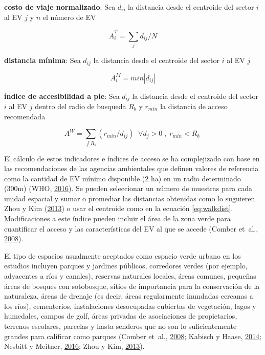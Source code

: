 \documentclass[12pt,a4paper,openany]{book}
\theoremstyle{definition}
\theoremstyle{definition}
\theoremstyle{definition}
\theoremstyle{remark}
\begin{document}
\textbf{costo de viaje normalizado}: Sea \(d_{ij}\) la distancia desde
el centroide del sector \(i\) al EV \(j\) y \(n\) el número de EV

\begin{equation}
\bar{A}^{T}_i =\sum_j{d_{ij}/N}
\label{eq:ncosto}
\end{equation}

\textbf{distancia mínima}: Sea \(d_{ij}\) la distancia desde el
centroide del sector \(i\) al EV \(j\)

\begin{equation}
A^{M}_i=min\left | d_{ij} \right | 
\label{eq:mindist}
\end{equation}

\textbf{índice de accesibilidad a pie}: Sea \(d_{ij}\) la distancia
desde el centroide del sector \(i\) al EV \(j\) dentro del radio de
busqueda \(R_b\) y \(r_{min}\) la distancia de acceso recomendada

\begin{equation}
A^{W}= \sum_{\int R_b }{(r_{min}/d_{ij})}  \;  \; \forall  d_j>0 \; , \; r_{min}<R_b  \;
\label{eq:walkdist}
\end{equation}

El cálculo de estos indicadores e índices de acceso se ha complejizado
con base en las recomendaciones de las agencias ambientales que definen
valores de referencia como la cantidad de EV mínimo disponible (2 ha) en
un radio determinado (300m) (WHO,
\protect\hyperlink{ref-who2016urban}{2016}). Se pueden seleccionar un
número de muestras para cada unidad espacial y sumar o promediar las
distancias obtenidas como lo suguieren Zhou y Kim
(\protect\hyperlink{ref-zhou_social_2013}{2013}) o usar el centroide
como en la ecuación \eqref{eq:walkdist}. Modificaciones a este índice
pueden incluir el área de la zona verde para cuantificar el acceso y las
características del EV al que se accede (Comber et~al.,
\protect\hyperlink{ref-comber_using_2008}{2008}).

El tipo de espacios usualmente aceptados como espacio verde urbano en
los estudios incluyen parques y jardines públicos, corredores verdes
(por ejemplo, adyacentes a ríos y canales), reservas naturales locales,
áreas comunes, pequeñas áreas de bosques con sotobosque, sitios de
importancia para la conservación de la naturaleza, áreas de drenaje (es
decir, áreas regularmente inundadas cercanas a los ríos), cementerios,
instalaciones desocupadas cubiertas de vegetación, lagos y humedales,
campos de golf, áreas privadas de asociaciones de propietarios, terrenos
escolares, parcelas y hasta senderos que no son lo suficientemente
grandes para calificar como parques (Comber et~al.,
\protect\hyperlink{ref-comber_using_2008}{2008}; Kabisch y Haase,
\protect\hyperlink{ref-kabisch_green_2014}{2014}; Nesbitt y Meitner,
\protect\hyperlink{ref-nesbitt_exploring_2016}{2016}; Zhou y Kim,
\protect\hyperlink{ref-zhou_social_2013}{2013}).
\end{document}
